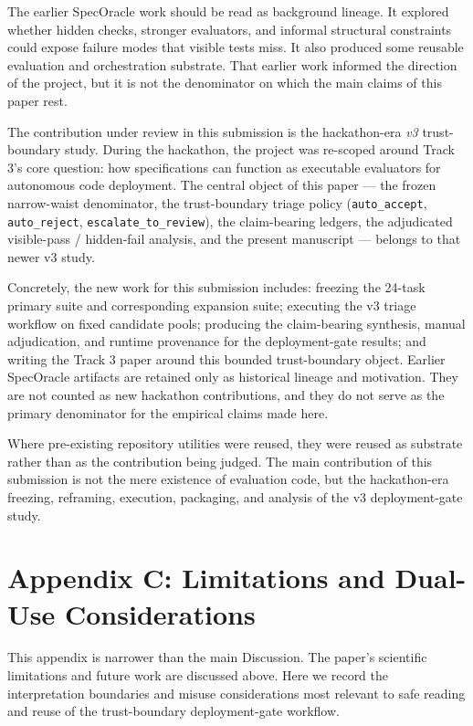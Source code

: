 \documentclass[11pt]{article}
\begin{document}
The earlier SpecOracle work should be read as background lineage. It explored whether hidden checks, stronger evaluators, and informal structural constraints could expose failure modes that visible tests miss. It also produced some reusable evaluation and orchestration substrate. That earlier work informed the direction of the project, but it is not the denominator on which the main claims of this paper rest.

The contribution under review in this submission is the hackathon-era \textit{v3} trust-boundary study. During the hackathon, the project was re-scoped around Track 3's core question: how specifications can function as executable evaluators for autonomous code deployment. The central object of this paper --- the frozen narrow-waist denominator, the trust-boundary triage policy (\texttt{auto\_accept}, \texttt{auto\_reject}, \texttt{escalate\_to\_review}), the claim-bearing ledgers, the adjudicated visible-pass / hidden-fail analysis, and the present manuscript --- belongs to that newer v3 study.

Concretely, the new work for this submission includes: freezing the 24-task primary suite and corresponding expansion suite; executing the v3 triage workflow on fixed candidate pools; producing the claim-bearing synthesis, manual adjudication, and runtime provenance for the deployment-gate results; and writing the Track 3 paper around this bounded trust-boundary object. Earlier SpecOracle artifacts are retained only as historical lineage and motivation. They are not counted as new hackathon contributions, and they do not serve as the primary denominator for the empirical claims made here.

Where pre-existing repository utilities were reused, they were reused as substrate rather than as the contribution being judged. The main contribution of this submission is not the mere existence of evaluation code, but the hackathon-era freezing, reframing, execution, packaging, and analysis of the v3 deployment-gate study.

\section*{Appendix C: Limitations and Dual-Use Considerations}

This appendix is narrower than the main Discussion. The paper's scientific limitations and future work are discussed above. Here we record the interpretation boundaries and misuse considerations most relevant to safe reading and reuse of the trust-boundary deployment-gate workflow.
\end{document}
